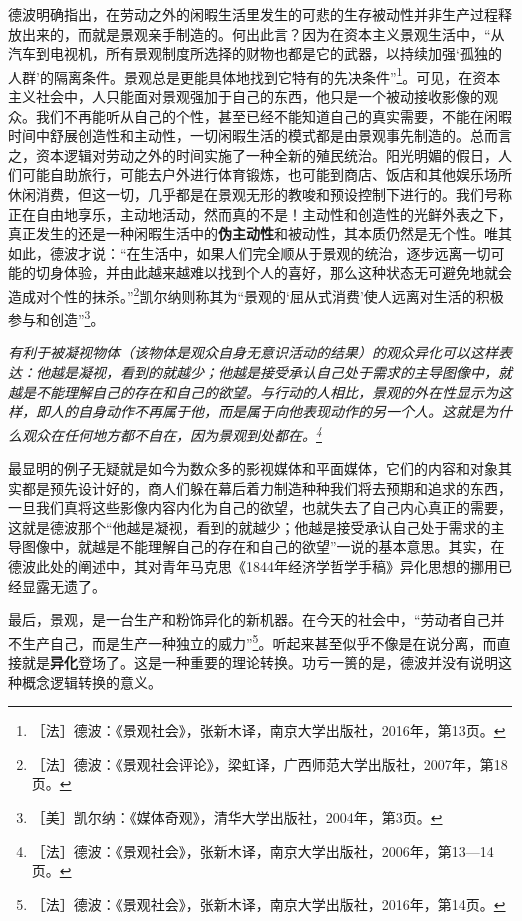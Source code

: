 \documentclass[fontset=fandol, a4paper, 12pt, openright]{ctexbook}
\renewenvironment{quote}
  {\list{}{\rightmargin\leftmargin}%
   \item\relax\small\itshape\color{darkgray}}
  {\endlist}
\begin{document}
德波明确指出，在劳动之外的闲暇生活里发生的可悲的生存被动性并非生产过程释放出来的，而就是景观亲手制造的。何出此言？因为在资本主义景观生活中，“从汽车到电视机，所有景观制度所选择的财物也都是它的武器，以持续加强‘孤独的人群’的隔离条件。景观总是更能具体地找到它特有的先决条件”\footnote{［法］德波：《景观社会》，张新木译，南京大学出版社，2016年，第13页。}。可见，在资本主义社会中，人只能面对景观强加于自己的东西，他只是一个被动接收影像的观众。我们不再能听从自己的个性，甚至已经不能知道自己的真实需要，不能在闲暇时间中舒展创造性和主动性，一切闲暇生活的模式都是由景观事先制造的。总而言之，资本逻辑对劳动之外的时间实施了一种全新的殖民统治。阳光明媚的假日，人们可能自助旅行，可能去户外进行体育锻炼，也可能到商店、饭店和其他娱乐场所休闲消费，但这一切，几乎都是在景观无形的教唆和预设控制下进行的。我们号称正在自由地享乐，主动地活动，然而真的不是！主动性和创造性的光鲜外表之下，真正发生的还是一种闲暇生活中的\textbf{伪主动性}和被动性，其本质仍然是无个性。唯其如此，德波才说：“在生活中，如果人们完全顺从于景观的统治，逐步远离一切可能的切身体验，并由此越来越难以找到个人的喜好，那么这种状态无可避免地就会造成对个性的抹杀。”\footnote{［法］德波：《景观社会评论》，梁虹译，广西师范大学出版社，2007年，第18页。}{\kaishu 凯尔纳则称其为“景观的‘屈从式消费’使人远离对生活的积极参与和创造”\footnote{［美］凯尔纳：《媒体奇观》，清华大学出版社，2004年，第3页。}。}

\begin{quote}
有利于被凝视物体（该物体是观众自身无意识活动的结果）的观众异化可以这样表达：他越是凝视，看到的就越少；他越是接受承认自己处于需求的主导图像中，就越是不能理解自己的存在和自己的欲望。与行动的人相比，景观的外在性显示为这样，即人的自身动作不再属于他，而是属于向他表现动作的另一个人。这就是为什么观众在任何地方都不自在，因为景观到处都在。\footnote{［法］德波：《景观社会》，张新木译，南京大学出版社，2006年，第13—14页。}
\end{quote}

最显明的例子无疑就是如今为数众多的影视媒体和平面媒体，它们的内容和对象其实都是预先设计好的，商人们躲在幕后着力制造种种我们将去预期和追求的东西，一旦我们真将这些影像内容内化为自己的欲望，也就失去了自己内心真正的需要，这就是德波那个“他越是凝视，看到的就越少；他越是接受承认自己处于需求的主导图像中，就越是不能理解自己的存在和自己的欲望”一说的基本意思。{\kaishu 其实，在德波此处的阐述中，其对青年马克思《1844年经济学哲学手稿》异化思想的挪用已经显露无遗了。}

最后，景观，是一台生产和粉饰异化的新机器。在今天的社会中，“劳动者自己并不生产自己，而是生产一种独立的威力”\footnote{［法］德波：《景观社会》，张新木译，南京大学出版社，2016年，第14页。}。听起来甚至似乎不像是在说分离，而直接就是\textbf{异化}登场了。这是一种重要的理论转换。{\kaishu 功亏一篑的是，德波并没有说明这种概念逻辑转换的意义。}
\end{document}
